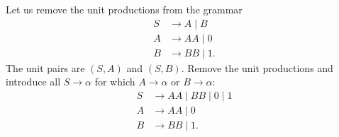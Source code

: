 

\setcounter{section}{5}
\setcounter{subsection}{2}
\setcounter{dfn}{10}

\begin{exl}
Let us remove the unit productions from the grammar
\begin{align*}
S &\to A \mid B\\
A &\to AA \mid 0\\
B &\to BB \mid 1.
\end{align*}
The unit pairs are $(S,A)$ and $(S,B)$.
Remove the unit productions and introduce all $S \to \alpha$ for which $A \to \alpha$ or $B \to \alpha$:
\begin{align*}
S &\to AA \mid BB \mid 0 \mid 1\\
A &\to AA \mid 0\\
B &\to BB \mid 1.
\end{align*}
\end{exl}

